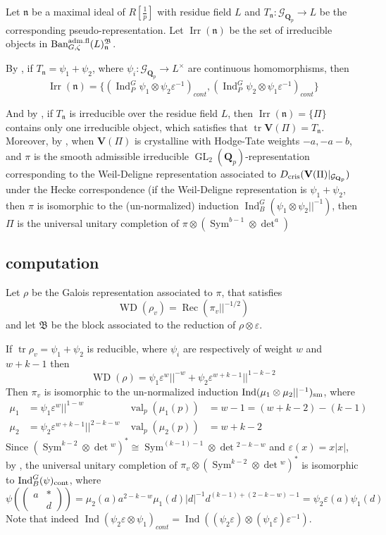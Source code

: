 \documentclass[leqno]{amsart}
\newcommand{\smat}[1]{\left( \begin{smallmatrix} #1 \end{smallmatrix} \right)}
\newcommand{\Ban}{\textnormal{Ban}^{\textnormal{adm.fl}}}
\newcommand{\B}{\mathfrak B}
\newcommand{\Gp}{\mathcal{G}_{\Qp}} %
\newcommand{\cris}{\textnormal{cris}}
\DeclareMathOperator{\Irr}{Irr}
\DeclareMathOperator{\WD}{WD}
\DeclareMathOperator{\Rec}{Rec}
\newcommand{\cont}{\textnormal{cont}}
\newcommand{\sm}{\textnormal{sm}}
\DeclareMathOperator{\GL}{GL}
\DeclareMathOperator{\mtr}{tr}
\DeclareMathOperator{\Sym}{Sym}
\newcommand{\Qp}{\mathbf{Q}_p}
\DeclareMathOperator{\val}{val}
\newcommand{\fn}{\mathfrak{n}}
\DeclareMathOperator{\Ind}{Ind}
\theoremstyle{definition}
\theoremstyle{remark}
\begin{document}
Let $\fn$ be a maximal ideal of  $R[\frac{1}{p}]$
with residue field  $L$ and 
$T_\fn\colon \Gp\to L$ 
be the corresponding pseudo-representation.
Let  $\Irr(\fn)$
be the set of irreducible objects in  $\Ban_{G,\zeta}(L)^\B_{\fn}$.

By \cite[Cor 8.15]{pask}, 
if $T_\fn=\psi_1+\psi_2$,
where  $\psi_i\colon \Gp\to L^\times$
are continuous homomorphisms, then  
\begin{equation}\label{eq:comple1}
	\Irr(\fn)=\{(\Ind_P^G\psi_1\otimes\psi_2\varepsilon^{-1})_{cont},
	(\Ind_P^G\psi_2\otimes\psi_1\varepsilon^{-1})_{cont}\}
\end{equation}

And by \cite[Cor 8.14]{pask}, 
if $T_\fn$ is irreducible over the residue field $L$, 
then $\Irr(\fn)=\{\Pi\}$ contains only one irreducible object,
which satisfies that $\mtr\mathbf{V}(\Pi)=T_\fn$.
Moreover, by \cite[Thm. 1.3]{CDP},
when $\mathbf{V}(\Pi)$ is crystalline with Hodge-Tate weights $-a,-a-b$,
and $\pi$ is the smooth admissible irreducible
$\GL_2(\Qp)$-representation
corresponding to the Weil-Deligne representation
associated to  $D_{\cris}(\mathbf{V}(\Pi)\vert_{\Gp})$
under the Hecke correspondence
(if the Weil-Deligne representation is $\psi_1+\psi_2$,
then $\pi$ is isomorphic to 
the (un-normalized) induction $\Ind_B^G(\psi_1\otimes\psi_2||^{-1})$,
then $\Pi$ is the universal unitary completion
of  $\pi\otimes(\Sym^{b-1}\otimes \det^a)$


\subsection{computation}

Let $\rho$ be the Galois representation
associated to  $\pi$, that satisfies
\[
	\WD(\rho_v)=\Rec(\pi_v||^{-1/2})
\]
and let $\B$ be the block associated to the reduction
of  $\rho\otimes\varepsilon$.

If $\mtr\rho_v=\psi_1+\psi_2$ is reducible,
where $\psi_i$ are respectively of weight
$w$ and  $w+k-1$
then 
\[
	\WD(\rho)=\psi_1\varepsilon^w||^{-w}+
	\psi_2\varepsilon^{w+k-1}||^{1-k-2}
\]
Then $\pi_v$ is isomorphic to the un-normalized induction
$\Ind(\mu_1\otimes\mu_2||^{-1})_{\sm}$, where
\begin{align*}
	\mu_1&=\psi_1\varepsilon^{w}||^{1-w} &
	\val_p(\mu_1(p))&=w-1=(w+k-2)-(k-1)\\
	\mu_2&=\psi_2\varepsilon^{w+k-1}||^{2-k-w} &
	\val_p(\mu_2(p))&=w+k-2
\end{align*}
Since $(\Sym^{k-2}\otimes\det{}^w)^*\cong \Sym^{(k-1)-1}\otimes\det{}^{2-k-w}$
and $\varepsilon(x)=x|x|$,
by \cite[Thm 12.3]{pask}, 
the universal unitary completion
of $\pi_v\otimes(\Sym^{k-2}\otimes\det{}^w)^*$
is isomorphic to $\Ind_B^G(\psi)_{\cont}$, where
\[
	\psi(\smat{a&*\\&d})=\mu_2(a)a^{2-k-w}\mu_1(d)|d|^{-1}d^{(k-1)+(2-k-w)-1}
	=\psi_2\varepsilon(a)\psi_1(d)
\]
Note that indeed 
$\Ind(\psi_2\varepsilon\otimes\psi_1)_{cont}=
\Ind((\psi_2\varepsilon)\otimes(\psi_1\varepsilon)\varepsilon^{-1})$.
\end{document}
